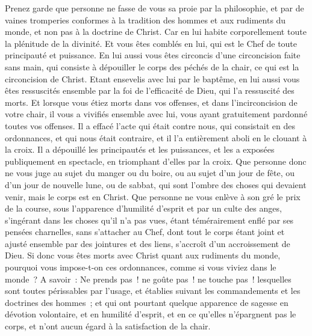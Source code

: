 \begin{multicols}{2}
Prenez garde que personne ne fasse de vous sa proie par la philosophie, et par de vaines tromperies conformes à la tradition des hommes et aux rudiments du monde, et non pas à la doctrine de Christ.
Car en lui habite corporellement toute la plénitude de la divinité.
Et vous êtes comblés en lui, qui est le Chef de toute principauté et puissance.
En lui aussi vous êtes circoncis d'une circoncision faite sans main, qui consiste à dépouiller le corps des péchés de la chair, ce qui est la circoncision de Christ.
Etant ensevelis avec lui par le baptême, en lui aussi vous êtes ressuscités ensemble par la foi de l'efficacité de Dieu, qui l'a ressuscité des morts.
Et lorsque vous étiez morts dans vos offenses, et dans l'incirconcision de votre chair, il vous a vivifiés ensemble avec lui, vous ayant gratuitement pardonné toutes vos offenses.
Il a effacé l'acte qui était contre nous, qui consistait en des ordonnances, et qui nous était contraire, et il l'a entièrement aboli en le clouant à la croix.
Il a dépouillé les principautés et les puissances, et les a exposées publiquement en spectacle, en triomphant d'elles par la croix.
Que personne donc ne vous juge au sujet du manger ou du boire, ou au sujet d'un jour de fête, ou d'un jour de nouvelle lune, ou de sabbat,
qui sont l'ombre des choses qui devaient venir, mais le corps est en Christ.
Que personne ne vous enlève à son gré le prix de la course, sous l'apparence d'humilité d'esprit et par un culte des anges, s'ingérant dans les choses qu'il n'a pas vues, étant témérairement enflé par ses pensées charnelles,
sans s'attacher au Chef, dont tout le corps étant joint et ajusté ensemble par des jointures et des liens, s'accroît d'un accroissement de Dieu.
Si donc vous êtes morts avec Christ quant aux rudiments du monde, pourquoi vous impose-t-on ces ordonnances, comme si vous viviez dans le monde~?
A savoir~: Ne prends pas~! ne goûte pas~! ne touche pas~!
lesquelles sont toutes périssables par l'usage, et établies suivant les commandements et les doctrines des hommes~; 
et qui ont pourtant quelque apparence de sagesse en dévotion volontaire, et en humilité d'esprit, et en ce qu'elles n'épargnent pas le corps, et n'ont aucun égard à la satisfaction de la chair.

\end{multicols}

